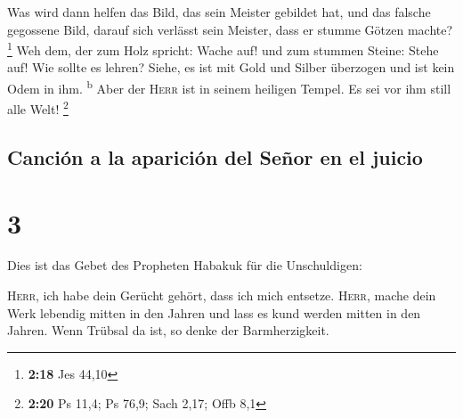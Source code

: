  Was wird dann helfen das Bild, das sein Meister gebildet
hat, und das falsche gegossene Bild, darauf sich verlässt sein Meister,
dass er stumme Götzen machte? \footnote{\textbf{2:18} Jes 44,10}
 Weh dem, der zum Holz spricht: Wache auf! und zum
stummen Steine: Stehe auf! Wie sollte es lehren? Siehe, es ist mit Gold
und Silber überzogen und ist kein Odem in ihm. \textsuperscript{b}
 Aber der \textsc{Herr} ist in seinem heiligen Tempel. Es
sei vor ihm still alle Welt! \footnote{\textbf{2:20} Ps 11,4; Ps 76,9;
  Sach 2,17; Offb 8,1}

\hypertarget{canciuxf3n-a-la-apariciuxf3n-del-seuxf1or-en-el-juicio}{%
\subsection{Canción a la aparición del Señor en el
juicio}\label{canciuxf3n-a-la-apariciuxf3n-del-seuxf1or-en-el-juicio}}

\hypertarget{section-2}{%
\section{3}\label{section-2}}

 Dies ist das Gebet des Propheten Habakuk für die
Unschuldigen:

 \textsc{Herr}, ich habe dein Gerücht gehört, dass ich
mich entsetze. \textsc{Herr}, mache dein Werk lebendig mitten in den
Jahren und lass es kund werden mitten in den Jahren. Wenn Trübsal da
ist, so denke der Barmherzigkeit.

